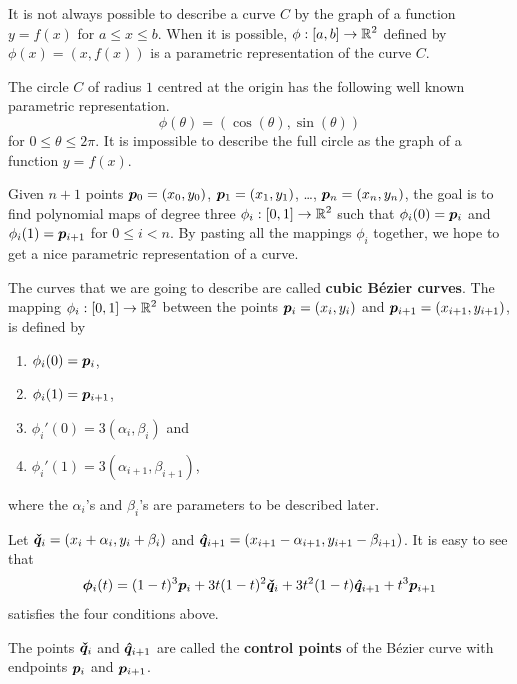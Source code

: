 It is not always possible to describe a curve $C$ by the graph of a
function $y=f(x)$ for $a\leq x \leq b$.  When it is possible,
$\displaystyle \phi:[a,b]\to \mathbb{R}^2$ defined by $\phi(x) = (x,f(x))$ is
a parametric representation of the curve $C$.

\begin{egg}
The circle $C$ of radius $1$ centred at the origin has the following
well known parametric representation.
\[
\phi(\theta) = (\cos(\theta),\sin(\theta))
\]
for $0 \leq \theta \leq 2 \pi$.  It is impossible to describe the full
circle as the graph of a function $y=f(x)$.
\end{egg}

Given $n+1$ points $\bm{p}_0 = (x_0,y_0)$, $\bm{p}_1 = (x_1,y_1)$,
\ldots, $\bm{p}_n = (x_n,y_n)$, the goal is to find polynomial
maps of degree three $\displaystyle \phi_i:[0,1] \rightarrow \mathbb{R}^2$ such
that $\phi_i(0) = \bm{p}_i$ and $\phi_i(1) = \bm{p}_{i+1}$ for $0\leq i <n$.
By pasting all the mappings $\phi_i$ together, we hope to get a
nice parametric representation of a curve.

The curves that we are going to describe are called
{\bfseries cubic Bézier curves}.
The mapping $\displaystyle \phi_i:[0,1]\to \mathbb{R}^2$ between
the points $\bm{p}_i = (x_i,y_i)$ and $\bm{p}_{i+1} = (x_{i+1},y_{i+1})$,
is defined by
\begin{enumerate}
\item $\phi_i(0) = \bm{p}_i$,
\item $\phi_i(1) = \bm{p}_{i+1}$,
\item $\phi_i'(0) = 3(\alpha_i,\beta_i)$ and
\item $\phi_i'(1) = 3(\alpha_{i+1}, \beta_{i+1})$,
\end{enumerate}
where the $\alpha_i$'s and $\beta_i$'s are parameters to be described
later.

Let $\bm{\check{q}}_i=(x_i+\alpha_i,y_i+\beta_i)$ and
$\bm{\hat{q}}_{i+1}=(x_{i+1}-\alpha_{i+1},y_{i+1}-\beta_{i+1})$.
It is easy to see that
\begin{equation}\label{Bez_form1}
\bm{\phi}_i(t) = (1-t)^3 \bm{p}_i + 3t(1-t)^2 \bm{\check{q}}_i
+ 3t^2(1-t) \bm{\hat{q}}_{i+1} + t^3 \bm{p}_{i+1}
\end{equation}
satisfies the four conditions above.

The points $\bm{\check{q}}_i$ and $\bm{\hat{q}}_{i+1}$ are called
the {\bfseries control points}
of the Bézier curve with endpoints $\bm{p}_i$ and $\bm{p}_{i+1}$.

